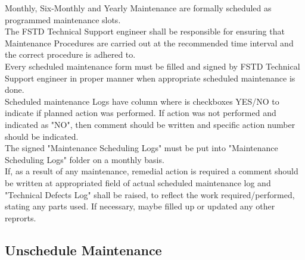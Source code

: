        Monthly, Six-Monthly and Yearly Maintenance are formally scheduled as programmed maintenance slots. \\
        \vspace{3mm}
        The FSTD Technical Support engineer shall be responsible for ensuring that Maintenance Procedures are carried out at the recommended time 
        interval and the correct procedure is adhered to. \\
        \vspace{3mm}
        Every scheduled maintenance form must be filled and signed by FSTD Technical Support engineer in proper manner when appropriate scheduled 
        maintenance is done. \\ 
        \vspace{3mm}
        Scheduled maintenance Logs have column where is checkboxes YES/NO to indicate if planned action was performed. If action was not performed and 
        indicated as "NO", then comment should be written and specific action number should be indicated. \\ 
        \vspace{3mm}
        The signed "Maintenance Scheduling Logs" must be put into "Maintenance Scheduling Logs" folder on a monthly basis. \\ 
        \vspace{3mm}
        If, as a result of any maintenance, remedial action is required a comment should be written at appropriated field of actual scheduled maintenance 
        log and "Technical Defects Log" shall be raised, to reflect the work required/performed, stating any parts used. If necessary, maybe filled up or 
        updated any other reprorts.
    \subsection{Unschedule Maintenance}
